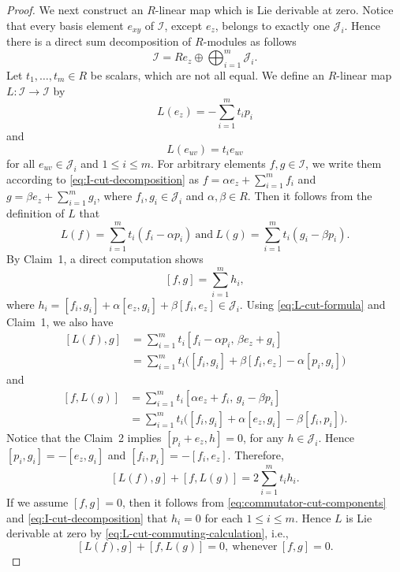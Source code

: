 \documentclass[10pt,a4paper]{amsart}
\newcommand{\I}{\mathcal I}
\begin{document}
\begin{proof}
\smallskip
We next construct an $R$-linear map which is Lie derivable at zero.
Notice that every basis element $e_{xy}$ of $\I$, except $e_z$, belongs to exactly one $\mathcal{J}_i$.
Hence there is a direct sum decomposition of $R$-modules as follows
\begin{equation}\label{eq:I-cut-decomposition}
\I=Re_z\oplus\bigoplus_{i=1}^m\mathcal J_i.
\end{equation}
Let $t_1,\ldots,t_m\in R$ be scalars, which are not all equal. We define an $R$-linear map $L:\I\to\I$ by
\[
L(e_z)=-\sum_{i=1}^m t_ip_i
\]
and
\[
L(e_{uv})=t_i e_{uv}
\]
for all $e_{uv}\in \mathcal{J}_i$ and $1\leq i\leq m$. For arbitrary elements $f,g\in \I$,
we write them according to \eqref{eq:I-cut-decomposition} as
$f=\alpha e_z+\sum_{i=1}^m f_i$ and $g=\beta e_z+\sum_{i=1}^m g_i$, where
$f_i,g_i\in\mathcal J_i$ and $\alpha,\beta\in R$.
Then it follows from the definition of $L$ that
\begin{equation}\label{eq:L-cut-formula}
L(f)=\sum_{i=1}^m t_i(f_i-\alpha p_i)~\text{and}~
L(g)=\sum_{i=1}^m t_i(g_i-\beta p_i).
\end{equation}
By Claim~1, a direct computation shows
\begin{equation}\label{eq:commutator-cut-components}
[f,g]=\sum_{i=1}^m h_i,
\end{equation}
where
$h_i=[f_i,g_i]+\alpha[e_z,g_i]+\beta[f_i,e_z]\in\mathcal J_i$.
Using \eqref{eq:L-cut-formula} and Claim~1, we also have
\[
\begin{aligned}
{}[L(f),g]
&=\sum_{i=1}^m t_i
[f_i-\alpha p_i,\,\beta e_z+g_i]\\
&=\sum_{i=1}^m t_i
\bigl([f_i,g_i]+\beta[f_i,e_z]-\alpha[p_i,g_i]\bigr)
\end{aligned}
\]
and
\[
\begin{aligned}
{}[f,L(g)]
&=\sum_{i=1}^m t_i
[\alpha e_z+f_i,\,g_i-\beta p_i]\\
&=\sum_{i=1}^m t_i
\bigl([f_i,g_i]+\alpha[e_z,g_i]-\beta[f_i,p_i]\bigr).
\end{aligned}
\]
Notice that the Claim~2 implies $[p_i+e_z,h]=0$, for any $h\in\mathcal J_i$. Hence
$[p_i,g_i]=-[e_z,g_i]$ and $[f_i,p_i]=-[f_i,e_z]$. Therefore,
\begin{equation}\label{eq:L-cut-commuting-calculation}
[L(f),g]+[f,L(g)]=2\sum_{i=1}^m t_i h_i.
\end{equation}
If we assume $[f,g]=0$, then it follows from \eqref{eq:commutator-cut-components} and \eqref{eq:I-cut-decomposition}
that $h_i=0$ for each $1\leq i\leq m$. Hence $L$ is Lie derivable at zero by \eqref{eq:L-cut-commuting-calculation}, i.e.,
\begin{equation}\label{eq:counterexample-commuting}
[L(f),g]+[f,L(g)]=0,~\text{whenever}~[f,g]=0.
\end{equation}


\end{proof}
\end{document}
